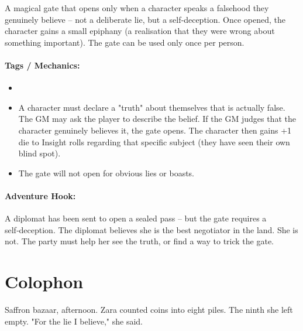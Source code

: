 A magical gate that opens only when a character speaks a falsehood they genuinely believe -- not a deliberate lie, but a self‑deception. Once opened, the character gains a small epiphany (a realisation that they were wrong about something important). The gate can be used only once per person.

\paragraph{Tags / Mechanics:}
\begin{itemize}
\item [TRUTH] [THRESHOLD]
\item A character must declare a "truth" about themselves that is actually false. The GM may ask the player to describe the belief. If the GM judges that the character genuinely believes it, the gate opens. The character then gains +1 die to Insight rolls regarding that specific subject (they have seen their own blind spot).
\item The gate will not open for obvious lies or boasts.
\end{itemize}

\paragraph{Adventure Hook:}
A diplomat has been sent to open a sealed pass -- but the gate requires a self‑deception. The diplomat believes she is the best negotiator in the land. She is not. The party must help her see the truth, or find a way to trick the gate.

\section*{Colophon}
Saffron bazaar, afternoon. Zara counted coins into eight piles. The ninth she left empty. "For the lie I believe," she said.

